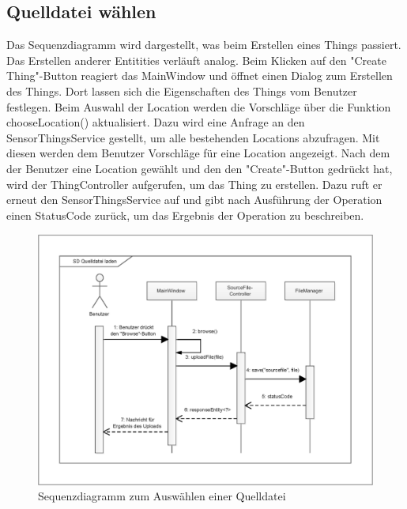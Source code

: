 \clearpage
\subsection{Quelldatei wählen}

Das Sequenzdiagramm wird dargestellt, was beim Erstellen eines Things passiert.
Das Erstellen anderer Entitities verläuft analog.
Beim Klicken auf den "{Create Thing}"{-Button} reagiert das MainWindow und öffnet einen Dialog zum Erstellen des Things.
Dort lassen sich die Eigenschaften des Things vom Benutzer festlegen.
Beim Auswahl der Location werden die Vorschläge über die Funktion chooseLocation() aktualisiert.
Dazu wird eine Anfrage an den SensorThingsService gestellt, um alle bestehenden Locations abzufragen.
Mit diesen werden dem Benutzer Vorschläge für eine Location angezeigt.
Nach dem der Benutzer eine Location gewählt und den den "{Create}"{-Button} gedrückt hat, wird der ThingController aufgerufen, um das Thing zu erstellen.
Dazu ruft er erneut den SensorThingsService auf und gibt nach Ausführung der Operation einen StatusCode zurück, um das Ergebnis der Operation zu beschreiben.

\begin{figure}[htbp]
\centering
\includegraphics[scale=0.4]{uml/SD_sourceFile.eps}
\caption{Sequenzdiagramm zum Auswählen einer Quelldatei}
\end{figure}